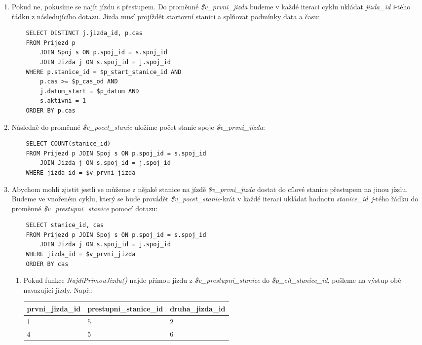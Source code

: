 \documentclass[11pt]{article}
\begin{document}
\begin{enumerate}
\begin{enumerate}
        \item Pokud ne, pokusíme se najít jízdu s přestupem. Do proměnné \textit{\$v\_prvni\_jizda} budeme v každé iteraci cyklu ukládat \textit{jizda\_id} \textit{i}-tého řádku z následujícího dotazu. Jízda musí projíždět startovní stanici a splňovat podmínky data a času:
        \begin{lstlisting}
    SELECT DISTINCT j.jizda_id, p.cas
    FROM Prijezd p
        JOIN Spoj s ON p.spoj_id = s.spoj_id
        JOIN Jizda j ON s.spoj_id = j.spoj_id
    WHERE p.stanice_id = $p_start_stanice_id AND
        p.cas >= $p_cas_od AND 
        j.datum_start = $p_datum AND
        s.aktivni = 1
    ORDER BY p.cas
        \end{lstlisting}

        \item Následně do proměnné \textit{\$v\_pocet\_stanic} uložíme počet stanic spoje \textit{\$v\_prvni\_jizda}:
        \begin{lstlisting}
    SELECT COUNT(stanice_id)
    FROM Prijezd p JOIN Spoj s ON p.spoj_id = s.spoj_id
        JOIN Jizda j ON s.spoj_id = j.spoj_id
    WHERE jizda_id = $v_prvni_jizda
        \end{lstlisting}

        \item Abychom mohli zjistit jestli se můžeme z nějaké stanice na jízdě \textit{\$v\_prvni\_jizda} dostat do cílové stanice přestupem na jinou jízdu. Budeme ve vnořeném cyklu, který se bude provádět \textit{\$v\_pocet\_stanic}-krát v každé iteraci ukládat hodnotu \mbox{\textit{stanice\_id}~\textit{j}-tého} řádku do proměnné \textit{\$v\_prestupni\_stanice} pomocí dotazu:
        \begin{lstlisting}
    SELECT stanice_id, cas
    FROM Prijezd p JOIN Spoj s ON p.spoj_id = s.spoj_id
        JOIN Jizda j ON s.spoj_id = j.spoj_id
    WHERE jizda_id = $v_prvni_jizda
    ORDER BY cas
        \end{lstlisting}

        \begin{enumerate}
            \item Pokud funkce \textit{NajdiPrimouJizdu()} najde přímou jízdu z \textit{\$v\_prestupni\_stanice} do \textit{\$p\_cil\_stanice\_id}, pošleme na výstup obě navazující jízdy. Např.:
            \begin{table}[h!]
                \begin{tabular}{|l|l|l|}
                    \hline
                    prvni\_jizda\_id & prestupni\_stanice\_id & druha\_jizda\_id \\ \hline
                    1 & 5 & 2 \\
                    4 & 5 & 6 \\
                    \hline
                \end{tabular}
                \centering
            \end{table}
        \end{enumerate}
    \end{enumerate}
\end{enumerate}
\end{document}
